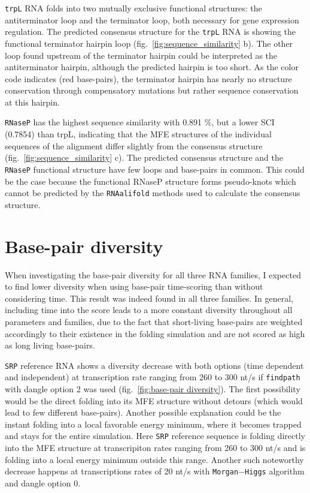 \documentclass[ twoside,openright,titlepage,numbers=noenddot,headinclude,%
                footinclude=false, cleardoublepage=empty,abstractoff, %
                BCOR=5mm,paper=a4,fontsize=11pt,%
                ngerman,american,%
                ]{scrreprt}
\begin{document}
\texttt{trpL} RNA folds into two mutually exclusive functional structures: the
antiterminator loop and the terminator loop, both necessary for gene
expression regulation. The predicted consensus structure for the \texttt{trpL} RNA
is showing the functional terminator hairpin loop (fig.~\ref{fig:sequence_similarity} b). The other loop found
upstream of the terminator hairpin could be interpreted as the
antiterminator hairpin, although the predicted hairpin is too short. As the
color code indicates (red base-pairs), the terminator hairpin has nearly no
structure conservation through compensatory mutations but rather sequence
conservation at this hairpin.

\texttt{RNaseP} has the highest sequence similarity with 0.891 \%, but a lower SCI
(0.7854) than trpL, indicating that the MFE structures of the individual sequences of the
alignment differ slightly from the consensus structure (fig.~\ref{fig:sequence_similarity} c).
The predicted
consensus structure and the \texttt{RNaseP} functional structure have few loops and
base-pairs in common. This could be the case because the functional RNaseP
structure forms pseudo-knots which cannot be predicted by the
\texttt{RNAalifold} methods used to calculate the consensus structure.


\section{Base-pair diversity}

When investigating the base-pair diversity for all three RNA families, I
expected to find lower diversity when using base-pair time-scoring than
without considering time. This result was indeed found in all three
families.
In general, including time into the score leads to a more constant diversity
throughout all parameters and families, due to the fact that short-living
base-pairs are weighted accordingly to their existence in the folding
simulation and are not scored as high as long living base-pairs.

\texttt{SRP} reference RNA shows a diversity decrease with both options (time
dependent and independent) at transcription rate ranging from 260 to 300
nt/s if \texttt{findpath} with dangle option 2 was used
(fig.~\ref{fig:base-pair diversity}).
The first possibility would be the direct folding into its MFE structure
without detours (which would lead to few different 
base-pairs). Another possible explanation could be the instant folding into
a local favorable energy minimum, where it becomes trapped and stays for
the entire simulation. Here \texttt{SRP} reference sequence is folding directly into the MFE structure at transcripiton rates ranging from 260 to 300 nt/s and is folding into a local energy minimum outside this range.
Another such noteworthy decrease happens at transcriptions rates of 20 nt/s with
\texttt{Morgan$-$Higgs} algorithm and dangle option $0$. 
\end{document}
